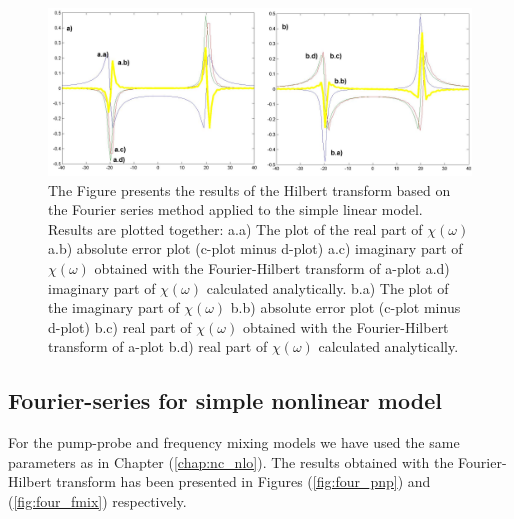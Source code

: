 \documentclass[12pt,twoside,a4paper]{article}
\numberwithin{equation}{subsection}
\numberwithin{figure}{subsection}
\begin{document}
\begin{figure} 
  \includegraphics[width=150mm]{img/four_lin.png}
  \caption{ The Figure presents the results of the Hilbert transform based on the Fourier series method applied to the simple linear model. Results are plotted together:
   a.a) The plot of the real part of $\chi (\omega )$ 
   a.b) absolute error plot (c-plot minus d-plot) 
   a.c) imaginary part of $\chi (\omega )$ obtained with the Fourier-Hilbert transform of a-plot 
   a.d) imaginary part of $\chi (\omega )$  calculated analytically. 
   b.a) The plot of the imaginary part of $\chi (\omega )$ 
   b.b) absolute error plot (c-plot minus d-plot) 
   b.c) real part of $\chi (\omega )$ obtained with the Fourier-Hilbert transform of a-plot 
   b.d) real part of $\chi (\omega )$ calculated analytically. \label{fig:four_lin}
  }
\end{figure} 

\subsection{Fourier-series for simple nonlinear model} \label{chap:fourier_nlo}

For the pump-probe and frequency mixing models we have used the same parameters as in Chapter (\ref{chap:nc_nlo}). The results obtained with the Fourier-Hilbert transform has been presented in Figures (\ref{fig:four_pnp}) and (\ref{fig:four_fmix}) respectively.
\end{document}

